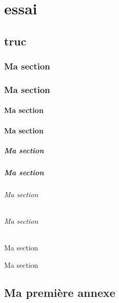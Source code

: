\documentclass[overfullbox]{polytech/polytech}
\begin{document}
\part{essai}
\label{part:essai}

\chapter{truc}
\lipsum[1-20]

\section{Ma section}
\lipsum[1-5]

\section{Ma section}
\lipsum[1-5]

\subsection{Ma section}
\lipsum[1-5]
\subsection{Ma section}
\lipsum[1-5]
\subsubsection{Ma section}
\lipsum[1-5]
\subsubsection{Ma section}
\lipsum[1-5]
\paragraph{Ma section}
\lipsum[1-5]
\paragraph{Ma section}
\lipsum[1-5]
\subparagraph{Ma section}
\lipsum[1-5]
\subparagraph{Ma section}
\lipsum[1-5]


\appendix

\chapter{Ma première annexe}

\lipsum[1-4]
\end{document}
